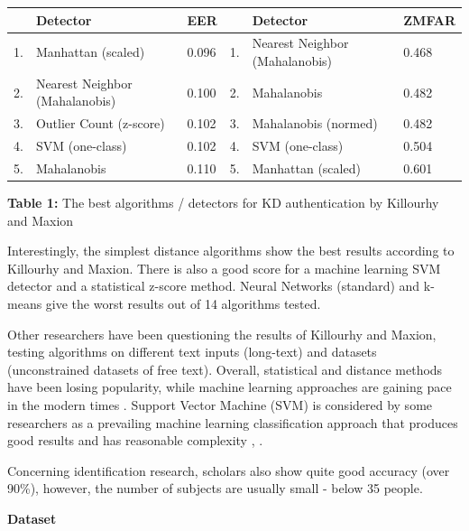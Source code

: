 \documentclass[12pt,a4]{article}
\begin{document}
\begin{center}

\begin{tabular*}{\textwidth}{l @{\extracolsep{\fill}} lllll}

\hline
 & \textbf{Detector} & \textbf{EER} & & \textbf{Detector} & \textbf{ZMFAR} \\
 \hline
1. & Manhattan (scaled) & 0.096 & 1. & Nearest Neighbor (Mahalanobis) & 0.468 \\ 
\hline
2. & Nearest Neighbor (Mahalanobis) & 0.100 & 2. & Mahalanobis & 0.482 \\ 
\hline
3. & Outlier Count (z-score) & 0.102 & 3. & Mahalanobis (normed) & 0.482 \\

\hline
4. & SVM (one-class) & 0.102 & 4. & SVM (one-class) & 0.504 \\
\hline
5. & Mahalanobis & 0.110 & 5. & Manhattan (scaled) & 0.601 \\
\hline
\end{tabular*}
\textbf{Table 1:} The best algorithms / detectors for KD authentication by Killourhy and Maxion
\end{center}

Interestingly, the simplest distance algorithms show the best results according to Killourhy and Maxion. There is also a good score for a machine learning SVM detector and a statistical z-score method. Neural Networks (standard) and k-means give the worst results out of 14 algorithms tested.

Other researchers have been questioning the results of Killourhy and Maxion, testing algorithms on different text inputs (long-text) and datasets (unconstrained datasets of free text). Overall, statistical and distance methods have been losing popularity, while machine learning approaches are gaining pace in the modern times \cite{Liakat:2017}. Support Vector Machine (SVM) is  considered by some researchers as a prevailing machine learning classification approach that produces good results and has reasonable complexity \cite{Liakat:2017}, \cite{raul2020comprehensive}.

Concerning identification research, scholars also show quite good accuracy (over 90\%)\cite{banerjee2012biometric}, however, the number of subjects are usually small - below 35 people. 

\bigskip
\large\textbf{Dataset}
\bigskip
\end{document}

